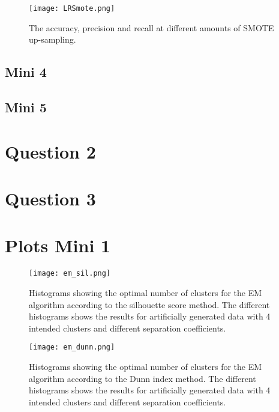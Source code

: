 \documentclass[11pt,twoside,swedish]{article}
\begin{document}
\begin{figure}
\begin{center}
\texttt{[image: LRSmote.png]}
\caption{The accuracy, precision and recall at different amounts of
  SMOTE up-sampling.}
\label{mini 3 smote}
\end{center}
\end{figure}


\subsection{Mini 4}\label{Mini 4}
\subsection{Mini 5}\label{Mini 5}

\section{Question 2}\label{Question 2}

\section{Question 3}\label{Question 3}

\newpage
\appendix

\section{Plots Mini 1}\label{Plots Mini 1}

\graphicspath{{/home/mikael/Repos/Courses/msa220/Mini/Mini/Mini_1/new_plots/}}
\begin{figure}
\begin{center}
\texttt{[image: em\_sil.png]}
\caption{Histograms showing the optimal number of clusters for the EM
  algorithm according to the silhouette score method. The different
  histograms shows the results for artificially generated data with 4
  intended clusters and different separation coefficients.}
\label{em_sil_hists}
\end{center}
\end{figure}

\begin{figure}
\begin{center}
\texttt{[image: em\_dunn.png]}
\caption{Histograms showing the optimal number of clusters for the EM
  algorithm according to the Dunn index method. The different
  histograms shows the results for artificially generated data with 4
  intended clusters and different separation coefficients.}
\label{em_dunn_hists}
\end{center}
\end{figure}
\end{document}
